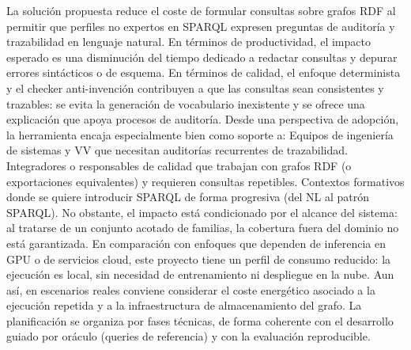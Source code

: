 {}\markdownRendererHorizontalRule{}\markdownRendererInterblockSeparator
{}\markdownRendererInterblockSeparator
{}\markdownRendererInterblockSeparator
{}La solución propuesta reduce el coste de formular consultas sobre grafos RDF al permitir que perfiles no expertos en SPARQL expresen preguntas de auditoría y trazabilidad en lenguaje natural. En términos de productividad, el impacto esperado es una disminución del tiempo dedicado a redactar consultas y depurar errores sintácticos o de esquema.\markdownRendererInterblockSeparator
{}En términos de calidad, el enfoque determinista y el checker anti-invención contribuyen a que las consultas sean consistentes y trazables: se evita la generación de vocabulario inexistente y se ofrece una explicación que apoya procesos de auditoría.\markdownRendererInterblockSeparator
{}Desde una perspectiva de adopción, la herramienta encaja especialmente bien como soporte a:\markdownRendererInterblockSeparator
{}\markdownRendererUlBeginTight
\markdownRendererUlItem Equipos de ingeniería de sistemas y V\markdownRendererBackslash{}\markdownRendererAmpersand{}V que necesitan auditorías recurrentes de trazabilidad.\markdownRendererUlItemEnd 
\markdownRendererUlItem Integradores o responsables de calidad que trabajan con grafos RDF (o exportaciones equivalentes) y requieren consultas repetibles.\markdownRendererUlItemEnd 
\markdownRendererUlItem Contextos formativos donde se quiere introducir SPARQL de forma progresiva (del NL al patrón SPARQL).\markdownRendererUlItemEnd 
\markdownRendererUlEndTight \markdownRendererInterblockSeparator
{}No obstante, el impacto está condicionado por el alcance del sistema: al tratarse de un conjunto acotado de familias, la cobertura fuera del dominio no está garantizada.\markdownRendererInterblockSeparator
{} En comparación con enfoques que dependen de inferencia en GPU o de servicios cloud, este proyecto tiene un perfil de consumo reducido: la ejecución es local, sin necesidad de entrenamiento ni despliegue en la nube. Aun así, en escenarios reales conviene considerar el coste energético asociado a la ejecución repetida y a la infraestructura de almacenamiento del grafo.\markdownRendererInterblockSeparator
{}\markdownRendererInterblockSeparator
{}La planificación se organiza por fases técnicas, de forma coherente con el desarrollo guiado por oráculo (queries de referencia) y con la evaluación reproducible.\markdownRendererInterblockSeparator

